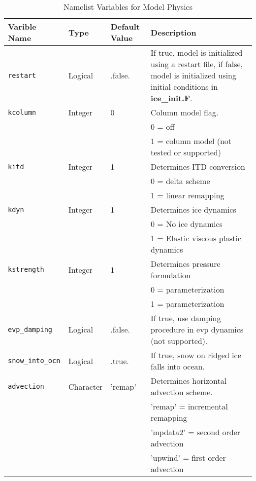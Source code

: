 \begin{table}
  \begin{center}
  \caption{Namelist Variables for Model Physics}
  \label{nml_physics}
  \begin{tabular}{p{3cm}p{2.0cm}p{3cm}p{6.5cm}} \hline
  Varible Name & Type & Default Value & Description               \\
\hline \hline

{\tt restart} & Logical & .false. & If true, model is initialized using a
   restart file, if false, model is initialized using initial conditions
   in {\bf ice\_init.F}. \\

{\tt kcolumn} &  Integer & 0 & Column model flag. \\
        &          &   & 0 = off \\
        &          &   & 1 = column model (not tested or supported)\\

{\tt kitd} &  Integer & 1 & Determines ITD conversion \\
     &          &   & 0 = delta scheme \\
     &          &   & 1 = linear remapping \\

{\tt kdyn} &  Integer & 1 & Determines ice dynamics \\
     &          &   & 0 = No ice dynamics\\
     &          &   & 1 = Elastic viscous plastic dynamics\\

{\tt kstrength} &  Integer & 1 &  Determines pressure formulation \\
          &          &   &  0 = \cite{hibl79} parameterization \\
          &          &   &  1 = \cite{roth75b} parameterization \\

{\tt evp\_damping} &  Logical & .false. & If true, use damping procedure
                                             in evp dynamics (not supported). \\

{\tt snow\_into\_ocn} &  Logical & .true. & If true, snow on ridged
                                                ice falls into ocean. \\

{\tt advection} &  Character & 'remap' &  Determines horizontal
                                               advection scheme. \\
          &            &   &  'remap' = incremental remapping \\
          &            &   &  'mpdata2' = second order advection \\
          &            &   &   'upwind' = first order advection \\


\end{tabular}
\end{center}
\end{table}
